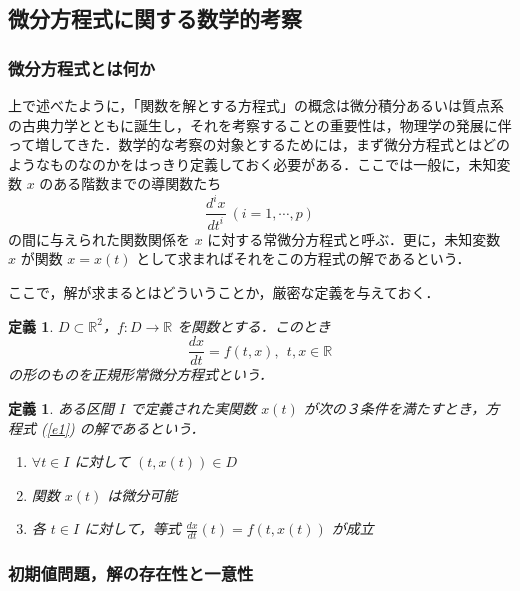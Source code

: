 \documentclass[dvipdfmx, a4paper]{jsarticle}
\newcommand{\R}{\mathbb{R}}
\newtheorem{definition}[theorem]{定義}
\begin{document}
\subsection{微分方程式に関する数学的考察}

\subsubsection{微分方程式とは何か}

上で述べたように，「関数を解とする方程式」の概念は微分積分あるいは質点系の古典力学とともに誕生し，それを考察することの重要性は，物理学の発展に伴って増してきた．数学的な考察の対象とするためには，まず微分方程式とはどのようなものなのかをはっきり定義しておく必要がある．ここでは一般に，未知変数 $x$ のある階数までの導関数たち
\begin{equation}
    \frac{d^i x}{dt^i}\ (i=1, \cdots, p)
\end{equation}
の間に与えられた関数関係を $x$ に対する常微分方程式と呼ぶ．更に，未知変数 $x$ が関数 $x=x(t)$ として求まればそれをこの方程式の解であるという．

ここで，解が求まるとはどういうことか，厳密な定義を与えておく．

\begin{definition}
    $D\subset\R^2$，$f: D\to\R$ を関数とする．このとき
    \begin{equation}
        \label{e1}
        \frac{dx}{dt}=f(t, x),\ \ t, x\in\R
    \end{equation}
    の形のものを正規形常微分方程式という．
\end{definition}

\begin{definition}
    ある区間 $I$ で定義された実関数 $x(t)$ が次の３条件を満たすとき，方程式 (\ref{e1}) の解であるという．
    \begin{enumerate}
        \item $\forall t\in I$ に対して $(t, x(t))\in D$
        \item 関数 $x(t)$ は微分可能
        \item 各 $t\in I$ に対して，等式 $\frac{dx}{dt}(t)=f(t, x(t))$ が成立
    \end{enumerate}
\end{definition}

\subsubsection{初期値問題，解の存在性と一意性}
\end{document}
